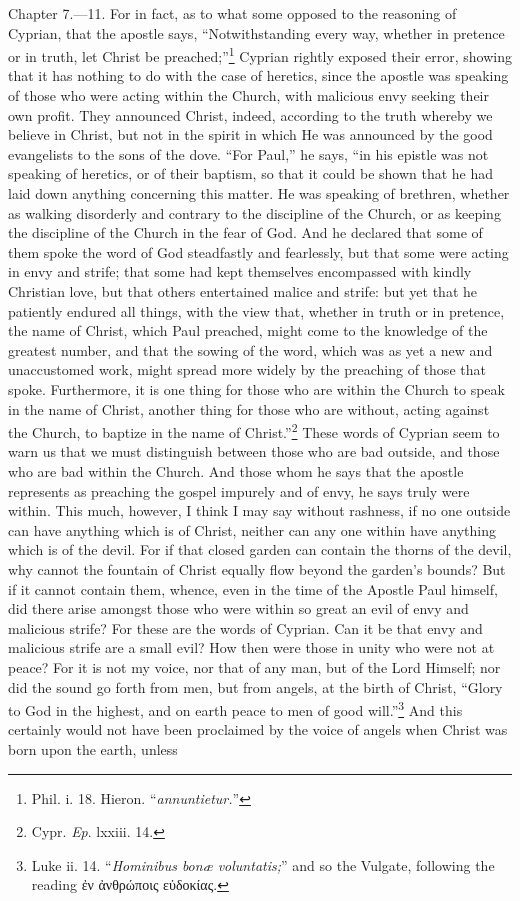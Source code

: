 Chapter 7.—11. For in fact, as to what some opposed to the reasoning of Cyprian, that the apostle says, ``Notwithstanding every way, whether in pretence or in truth, let Christ be preached;''\footnote{\par  Phil. i. 18. Hieron. ``\emph{annuntietur.}''} Cyprian rightly exposed their error, showing that it has nothing to do with the case of heretics, since the apostle was speaking of those who were acting within the Church, with malicious envy seeking their own profit. They announced Christ, indeed, according to the truth whereby we believe in Christ, but not in the spirit in which He was announced by the good evangelists to the sons of the dove. ``For Paul,'' he says, ``in his epistle was not speaking of heretics, or of their baptism, so that it could be shown that he had laid down anything concerning this matter. He was speaking of brethren, whether as walking disorderly and contrary to the discipline of the Church, or as keeping the discipline of the Church in the fear of God. And he declared that some of them spoke the word of God steadfastly and fearlessly, but that some were acting in envy and strife; that some had kept themselves encompassed with kindly Christian love, but that others entertained malice and strife: but yet that he patiently endured all things, with the view that, whether in truth or in pretence, the name of Christ, which Paul preached, might come to the knowledge of the greatest number, and that the sowing of the word, which was as yet a new and unaccustomed work, might spread more widely by the preaching of those that spoke. Furthermore, it is one thing for those who are within the Church to speak in the name of Christ, another thing for those who are without, acting against the Church, to baptize in the name of Christ.''\footnote{\par  Cypr. \emph{Ep}. lxxiii. 14.} These words of Cyprian seem to warn us that we must distinguish between those who are bad outside, and those who are bad within the Church. And those whom he says that the apostle represents as preaching the gospel impurely and of envy, he says truly were within. This much, however, I think I may say without rashness, if no one outside can have anything which is of Christ, neither can any one within have anything which is of the devil. For if that closed garden can contain the thorns of the devil, why cannot the fountain of Christ equally flow beyond the garden’s bounds? But if it cannot contain them, whence, even in the time of the Apostle Paul himself, did there arise amongst those who were within so great an evil of envy and malicious strife? For these are the words of Cyprian. Can it be that envy and malicious strife are a small evil? How then were those in unity who were not at peace? For it is not my voice, nor that of any man, but of the Lord Himself; nor did the sound go forth from men, but from angels, at the birth of Christ, ``Glory to God in the highest, and on earth peace to men of good will.''\footnote{\par  Luke ii. 14. ``\emph{Hominibus bonæ voluntatis;}'' and so the Vulgate, following the reading \textgreek{ἐν ἀνθρώποις εὐδοκίας}.} And this certainly would not have been proclaimed by the voice of angels when Christ was born upon the earth, unless 